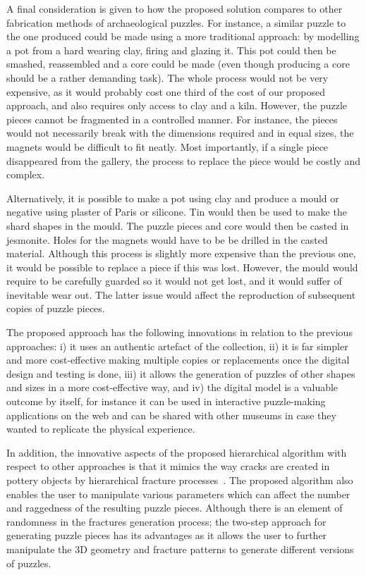 \documentclass[acmlarge,screen,dvipsnames]{acmart}
\begin{document}
\greenBegin

A final consideration is given to how the proposed solution compares
to other fabrication methods of archaeological puzzles. For instance,
a similar puzzle to the one produced could be made using a more
traditional approach: by modelling a pot from a hard wearing clay,
firing and glazing it. This pot could then be smashed, reassembled and
a core could be made (even though producing a core should be a rather
demanding task). The whole process would not be very expensive, as it
would probably cost one third of the cost of our proposed approach,
and also requires only access to clay and a kiln. However, the puzzle
pieces cannot be fragmented in a controlled manner. For instance, the
pieces would not necessarily break with the dimensions required and in
equal sizes, the magnets would be difficult to fit neatly. Most
importantly, if a single piece disappeared from the gallery, the
process to replace the piece would be costly and complex.

Alternatively, it is possible to make a pot using clay and produce a
mould or negative using plaster of Paris or silicone. Tin would then
be used to make the shard shapes in the mould. The puzzle pieces and
core would then be casted in jesmonite. Holes for the magnets would
have to be be drilled in the casted material. Although this process is
slightly more expensive than the previous one, it would be possible to
replace a piece if this was lost. However, the mould would require to
be carefully guarded so it would not get lost, and it would suffer of
inevitable wear out. The latter issue would affect the reproduction of
subsequent copies of puzzle pieces.

The proposed approach has the following innovations in relation to the
previous approaches: i) it uses an authentic artefact of the
collection, ii) it is far simpler and more cost-effective making
multiple copies or replacements once the digital design and testing is
done, iii) it allows the generation of puzzles of other shapes and
sizes in a more cost-effective way, and iv) the digital model is a
valuable outcome by itself, for instance it can be used in interactive
puzzle-making applications on the web and can be shared with other
museums in case they wanted to replicate the physical experience.

In addition, the innovative aspects of the proposed hierarchical algorithm 
with respect to other approaches is that it mimics the way cracks 
are created in pottery objects
by hierarchical fracture processes~\cite{Shin:2012:ASF:2362402.2362404}. 
The proposed algorithm also enables the user to manipulate various parameters 
which can affect the number and raggedness of the resulting puzzle pieces.
Although there is an element of randomness in the fractures generation 
process; the two-step approach for generating puzzle pieces has its
advantages as it allows the user to further manipulate the 3D geometry and 
fracture patterns to generate different versions of puzzles. 
\end{document}
